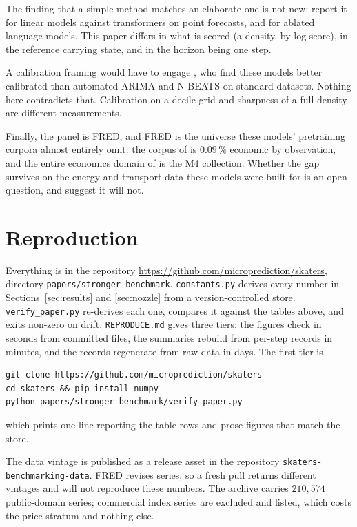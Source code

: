 \documentclass[article]{jss}
\providecommand{\proglang}[1]{\textsf{#1}}
\providecommand{\code}[1]{\texttt{#1}}
\begin{document}
The finding that a simple method matches an elaborate one is not new:
\citet{zeng2023transformers} report it for linear models against transformers
on point forecasts, and \citet{tan2024useful} for ablated language models.
This paper differs in what is scored (a density, by log score), in the
reference carrying state, and in the horizon being one step.

A calibration framing would have to engage \citet{adler2026calibrated}, who find
these models better calibrated than automated ARIMA and N-BEATS on standard
datasets. Nothing here contradicts that. Calibration on a decile grid and
sharpness of a full density are different measurements.

Finally, the panel is \proglang{FRED}, and \proglang{FRED} is the universe these
models' pretraining corpora almost entirely omit: the corpus of
\citet{woo2024moirai} is $0.09\,\%$ economic by observation, and the entire
economics domain of \citet{aksu2024gifteval} is the M4 collection. Whether the
gap survives on the energy and transport data these models were built for is an
open question, and \citet{wang2026spectral} suggest it will not.

\section{Reproduction}\label{sec:repro}

Everything is in the repository
\url{https://github.com/microprediction/skaters}, directory
\code{papers/stronger-benchmark}. \code{constants.py} derives every number in
Sections~\ref{sec:results} and \ref{sec:nozzle} from a version-controlled
store. \code{verify\_paper.py} re-derives each one, compares it against the
tables above, and exits non-zero on drift. \code{REPRODUCE.md} gives three
tiers: the figures check in seconds from committed files, the summaries rebuild
from per-step records in minutes, and the records regenerate from raw data in
days. The first tier is
\begin{verbatim}
git clone https://github.com/microprediction/skaters
cd skaters && pip install numpy
python papers/stronger-benchmark/verify_paper.py
\end{verbatim}
which prints one line reporting the table rows and prose figures that match
the store.

The data vintage is published as a release asset in the repository
\code{skaters-\allowbreak benchmarking-\allowbreak data}. \proglang{FRED} revises series, so a fresh
pull returns different vintages and will not reproduce these numbers. The archive carries $210{,}574$ public-domain series; commercial index
series are excluded and listed, which costs the price stratum and nothing else.



\end{document}
